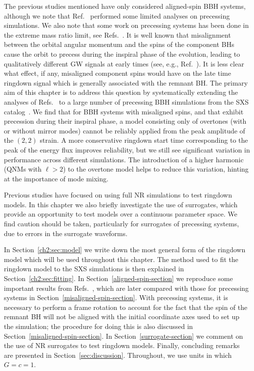 The previous studies mentioned have only considered aligned-spin BBH systems, although we note that Ref.~\cite{Kamaretsos:2012bs} performed some limited analyses on precessing simulations.
We also note that some work on precessing systems has been done in the extreme mass ratio limit, see Refs.~\cite{Hughes:2019zmt,Lim:2019xrb,Lim:2022veo}.
It is well known that misalignment between the orbital angular momentum and the spins of the component BHs cause the orbit to precess during the inspiral phase of the evolution, leading to qualitatively different GW signals at early times (see, e.g., Ref.~\cite{Apostolatos:1994mx}). 
It is less clear what effect, if any, misaligned component spins would have on the late time ringdown signal which is generally associated with the remnant BH. 
The primary aim of this chapter is to address this question by systematically extending the analyses of Refs.~\cite{Giesler:2019uxc, Dhani:2020nik} to a large number of precessing BBH simulations from the SXS catalog~\cite{Boyle:2019kee}. 
We find that for BBH systems with misaligned spins, and that exhibit precession during their inspiral phase, a model consisting only of overtones (with or without mirror modes) cannot be reliably applied from the peak amplitude of the $(2,2)$ strain. 
A more conservative ringdown start time corresponding to the peak of the energy flux improves reliability, but we still see significant variation in performance across different simulations. 
The introduction of a higher harmonic (QNMs with $\ell > 2$) to the overtone model helps to reduce this variation, hinting at the importance of mode mixing.

Previous studies have focused on using full NR simulations to test ringdown models. 
In this chapter we also briefly investigate the use of surrogates, which provide an opportunity to test models over a continuous parameter space. 
We find caution should be taken, particularly for surrogates of precessing systems, due to errors in the surrogate waveforms.

In Section~\ref{ch2:sec:model} we write down the most general form of the ringdown model which will be used throughout this chapter.
The method used to fit the ringdown model to the SXS simulations is then explained in Section~\ref{ch2:sec:fitting}.
In Section~\ref{aligned-spin-section} we reproduce some important results from Refs.~\cite{Giesler:2019uxc, Dhani:2020nik}, which are later compared with those for precessing systems in Section~\ref{misaligned-spin-section}. 
With precessing systems, it is necessary to perform a frame rotation to account for the fact that the spin of the remnant BH will not be aligned with the initial coordinate axes used to set up the simulation; the procedure for doing this is also discussed in Section~\ref{misaligned-spin-section}. 
In Section~\ref{surrogate-section} we comment on the use of NR surrogates to test ringdown models. 
Finally, concluding remarks are presented in Section~\ref{sec:discussion}. 
Throughout, we use units in which $G=c=1$.

